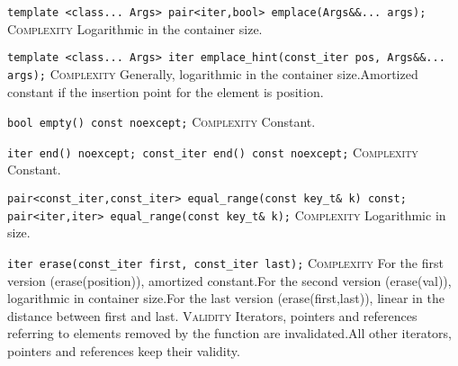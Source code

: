 \noindent{}\hspace*{0.25em}\lstinline[basicstyle=\ttfamily\color{clime}]{template <class... Args> pair<iter,bool> emplace(Args&&... args);} \textsc{Complexity} Logarithmic in the container size.\\\vspace{-0.6em}

\noindent{}\hspace*{0.25em}\lstinline[basicstyle=\ttfamily\color{clime}]{template <class... Args> iter emplace_hint(const_iter pos, Args&&... args);} \textsc{Complexity} Generally, logarithmic in the container size.Amortized constant if the insertion point for the element is position.\\\vspace{-0.6em}

\noindent{}\hspace*{0.25em}\lstinline[basicstyle=\ttfamily\color{cgreen}]{bool empty() const noexcept;} \textsc{Complexity} Constant.\\\vspace{-0.6em}

\noindent{}\hspace*{0.25em}\lstinline[basicstyle=\ttfamily\color{cgreen}]{iter end() noexcept; const_iter end() const noexcept;} \textsc{Complexity} Constant.\\\vspace{-0.6em}

\noindent{}\hspace*{0.25em}\lstinline[basicstyle=\ttfamily\color{clime}]{pair<const_iter,const_iter> equal_range(const key_t& k) const; pair<iter,iter> equal_range(const key_t& k);} \textsc{Complexity} Logarithmic in size.\\\vspace{-0.6em}

\noindent{}\hspace*{0.25em}\lstinline[basicstyle=\ttfamily\color{corange}]{iter erase(const_iter first, const_iter last);} \textsc{Complexity} For the first version (erase(position)), amortized constant.For the second version (erase(val)), logarithmic in container size.For the last version (erase(first,last)), linear in the distance between first and last. \textsc{Validity} Iterators, pointers and references referring to elements removed by the function are invalidated.All other iterators, pointers and references keep their validity.\\\vspace{-0.6em}


